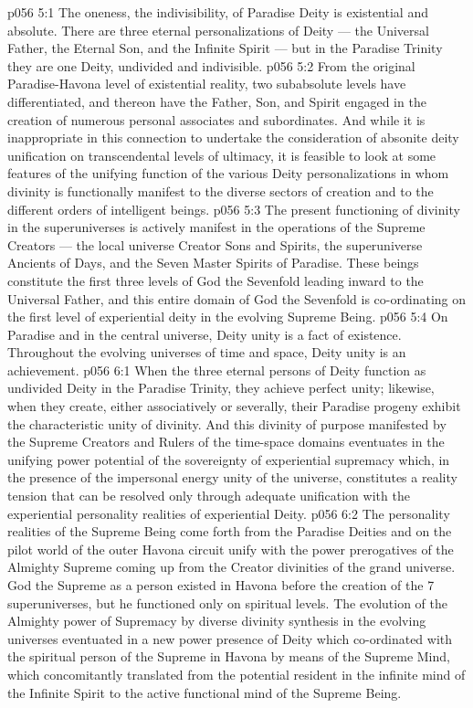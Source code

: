 \vs p056 5:1 The oneness, the indivisibility, of Paradise Deity is existential and absolute. There are three eternal personalizations of Deity --- the Universal Father, the Eternal Son, and the Infinite Spirit --- but in the Paradise Trinity they are  one Deity, undivided and indivisible.
\vs p056 5:2 \pc From the original Paradise\hyp{}Havona level of existential reality, two subabsolute levels have differentiated, and thereon have the Father, Son, and Spirit engaged in the creation of numerous personal associates and subordinates. And while it is inappropriate in this connection to undertake the consideration of absonite deity unification on transcendental levels of ultimacy, it is feasible to look at some features of the unifying function of the various Deity personalizations in whom divinity is functionally manifest to the diverse sectors of creation and to the different orders of intelligent beings.
\vs p056 5:3 The present functioning of divinity in the superuniverses is actively manifest in the operations of the Supreme Creators --- the local universe Creator Sons and Spirits, the superuniverse Ancients of Days, and the Seven Master Spirits of Paradise. These beings constitute the first three levels of God the Sevenfold leading inward to the Universal Father, and this entire domain of God the Sevenfold is co\hyp{}ordinating on the first level of experiential deity in the evolving Supreme Being.
\vs p056 5:4 \pc On Paradise and in the central universe, Deity unity is a fact of existence. Throughout the evolving universes of time and space, Deity unity is an achievement.
\vs p056 6:1 When the three eternal persons of Deity function as undivided Deity in the Paradise Trinity, they achieve perfect unity; likewise, when they create, either associatively or severally, their Paradise progeny exhibit the characteristic unity of divinity. And this divinity of purpose manifested by the Supreme Creators and Rulers of the time\hyp{}space domains eventuates in the unifying power potential of the sovereignty of experiential supremacy which, in the presence of the impersonal energy unity of the universe, constitutes a reality tension that can be resolved only through adequate unification with the experiential personality realities of experiential Deity.
\vs p056 6:2 The personality realities of the Supreme Being come forth from the Paradise Deities and on the pilot world of the outer Havona circuit unify with the power prerogatives of the Almighty Supreme coming up from the Creator divinities of the grand universe. God the Supreme as a person existed in Havona before the creation of the 7 superuniverses, but he functioned only on spiritual levels. The evolution of the Almighty power of Supremacy by diverse divinity synthesis in the evolving universes eventuated in a new power presence of Deity which co\hyp{}ordinated with the spiritual person of the Supreme in Havona by means of the Supreme Mind, which concomitantly translated from the potential resident in the infinite mind of the Infinite Spirit to the active functional mind of the Supreme Being.
